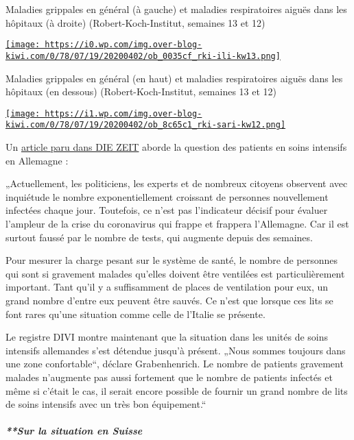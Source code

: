 Maladies grippales en général (à gauche) et maladies respiratoires
aiguës dans les hôpitaux (à droite) (Robert-Koch-Institut, semaines 13
et 12)

\href{http://img.over-blog-kiwi.com/0/78/07/19/20200402/ob_0035cf_rki-ili-kw13.png\#width=729\&height=448}{\texttt{[image: https://i0.wp.com/img.over-blog-kiwi.com/0/78/07/19/20200402/ob\_0035cf\_rki-ili-kw13.png]}}

Maladies grippales en général (en haut) et maladies respiratoires aiguës
dans les hôpitaux (en dessous) (Robert-Koch-Institut, semaines 13 et 12)

\href{http://img.over-blog-kiwi.com/0/78/07/19/20200402/ob_8c65c1_rki-sari-kw12.png\#width=885\&height=337}{\texttt{[image: https://i1.wp.com/img.over-blog-kiwi.com/0/78/07/19/20200402/ob\_8c65c1\_rki-sari-kw12.png]}}

Un
\href{https://www.zeit.de/wissen/2020-04/krankenhaeuser-kapazitaeten-coronavirus-patienten-deutschland/seite-2}{article
paru dans DIE ZEIT} aborde la question des patients en soins intensifs
en Allemagne :

„Actuellement, les politiciens, les experts et de nombreux citoyens
observent avec inquiétude le nombre exponentiellement croissant de
personnes nouvellement infectées chaque jour. Toutefois, ce n'est pas
l'indicateur décisif pour évaluer l'ampleur de la crise du coronavirus
qui frappe et frappera l'Allemagne. Car il est surtout faussé par le
nombre de tests, qui augmente depuis des semaines.

Pour mesurer la charge pesant sur le système de santé, le nombre de
personnes qui sont si gravement malades qu'elles doivent être ventilées
est particulièrement important. Tant qu'il y a suffisamment de places de
ventilation pour eux, un grand nombre d'entre eux peuvent être sauvés.
Ce n'est que lorsque ces lits se font rares qu'une situation comme celle
de l'Italie se présente.

Le registre DIVI montre maintenant que la situation dans les unités de
soins intensifs allemandes s'est détendue jusqu'à présent. „Nous sommes
toujours dans une zone confortable``, déclare Grabenhenrich. Le nombre
de patients gravement malades n'augmente pas aussi fortement que le
nombre de patients infectés et même si c'était le cas, il serait encore
possible de fournir un grand nombre de lits de soins intensifs avec un
très bon équipement.``

\hypertarget{sur-la-situation-en-suisse}{%
\subparagraph{**Sur la situation en
Suisse}\label{sur-la-situation-en-suisse}}

